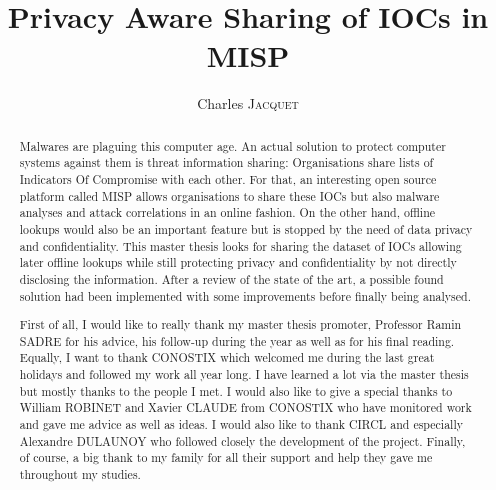 \documentclass{eplmastersthesis}
\title{Privacy Aware Sharing of IOCs in MISP}	%
\author{Charles \textsc{Jacquet}}	%
\begin{document}
\maketitle					%
\thispagestyle{empty}		%


\begin{abstract} 
Malwares are plaguing this computer age. An actual solution to protect computer systems against them is threat information sharing: Organisations share lists of Indicators Of Compromise with each other.
For that, an interesting open source platform called MISP allows organisations to share these IOCs but also malware analyses and attack correlations in an online fashion.
On the other hand, offline lookups would also be an important feature but is stopped by the need of data privacy and confidentiality. This master thesis looks for sharing the dataset of IOCs allowing later offline lookups while still protecting privacy and confidentiality by not directly disclosing the information. 
After a review of the state of the art, a possible found solution had been implemented with  some improvements before finally being analysed.
\end{abstract}


\renewcommand{\abstractname}{Acknowledgements}
\begin{abstract}
First of all, I would like to really thank my master thesis promoter, Professor Ramin SADRE for his advice, his follow-up during the year as well as for his final reading.
Equally, I want to thank CONOSTIX which welcomed me during the last great holidays and followed my work all year long. I have learned a lot via the master thesis but mostly thanks to the people I met. I would also like to give a special thanks to William ROBINET and Xavier CLAUDE from CONOSTIX who have monitored work and gave me advice as well as ideas. I would also like to thank CIRCL and especially Alexandre DULAUNOY who followed closely the development of the project. Finally, of course, a big thank to my family for all their support and help they gave me throughout my studies.
\end{abstract}

\tableofcontents
\end{document}
